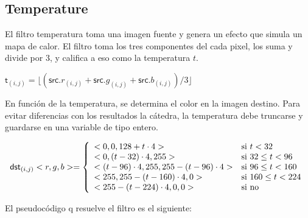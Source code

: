 \subsection{Temperature}

    El filtro temperatura toma una imagen fuente y genera un
    efecto que simula un mapa de calor. El filtro toma
    los tres componentes del cada pixel, los suma y divide por 3, y califica a eso
    como la temperatura $t$.

    \begin{center}
    $\mathsf{t}_{(i,j)} = \lfloor(\mathsf{src}.r_{(i,j)} + \mathsf{src}.g_{(i,j)} + \mathsf{src}.b_{(i,j)}) / 3\rfloor$
	\end{center}
    
    En función de la temperatura, se determina el color en la imagen destino. 
    Para evitar diferencias con los resultados la cátedra, la 
    temperatura debe truncarse y guardarse en una variable de tipo entero.

    \begin{center}
	\begin{displaymath}
	\mathsf{dst}_{(i,j)}<r,g,b> = \left\{
	\begin{array}{l l}
				<0,0, 128 + t \cdot 4> & \text{si }t < 32\\
				<0, (t - 32) \cdot 4, 255> & \text{si }32 \le t < 96\\
				<(t-96) \cdot 4, 255, 255 - (t-96) \cdot 4> & \text{si }96 \le t < 160\\
				<255, 255 - (t - 160) \cdot 4, 0> & \text{si }160 \le t < 224\\
				<255 - (t - 224) \cdot 4, 0 , 0> & \text{si no} \\
	\end{array}
	\right.
	\end{displaymath}
	\end{center}
	
	El pseudocódigo q resuelve el filtro es el siguiente:
	
